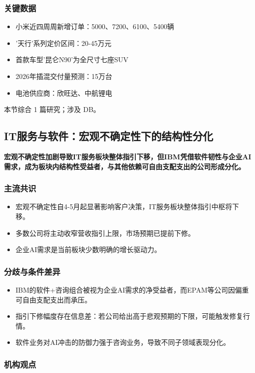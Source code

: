\documentclass[11pt]{ctexart}
\begin{document}
\subsubsection*{关键数据}
\begin{itemize}
  \item 小米近四周周新增订单：5000、7200、6100、5400辆
  \item '天行'系列定价区间：20-45万元
  \item 首款车型'昆仑N90'为全尺寸七座SUV
  \item 2026年插混交付量预测：15万台
  \item 电池供应商：欣旺达、中航锂电
\end{itemize}
{\small\color{refgray}本节综合 1 篇研究；涉及 DB。}
\newpage
\subsection{IT服务与软件：宏观不确定性下的结构性分化}
\textbf{宏观不确定性加剧导致IT服务板块整体指引下移，但IBM凭借软件韧性与企业AI需求，成为板块内结构性受益者，与其他依赖可自由支配支出的公司形成分化。}
\subsubsection*{主流共识}
\begin{itemize}
  \item 宏观不确定性自4-5月起显著影响客户决策，IT服务板块整体指引中枢将下移。
  \item 多数公司将主动收窄营收指引上限，市场预期已提前下修。
  \item 企业AI需求是当前板块少数明确的增长驱动力。
\end{itemize}
\subsubsection*{分歧与条件差异}
\begin{itemize}
  \item IBM的软件+咨询组合被视为企业AI需求的净受益者，而EPAM等公司因偏重可自由支配支出而承压。
  \item 指引下修幅度存在信息差：若公司给出高于悲观预期的下限，可能触发修复行情。
  \item 软件业务对AI冲击的防御力强于咨询业务，导致不同子领域表现分化。
\end{itemize}
\subsubsection*{机构观点}
\end{document}
